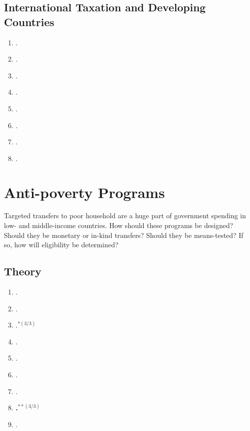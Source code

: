 \documentclass[11pt]{article}
\begin{document}
\subsection{International Taxation and Developing Countries}

\begin{enumerate}
\item {}.
\item {}.
\item {}.
\item {}.
\item {}.
\item {}.
\item {}.
\item {}.
\end{enumerate}

\section{ Anti-poverty Programs}
Targeted transfers to poor household are a huge part of government spending in low- and middle-income countries. How should these programs be designed? Should they be monetary or in-kind transfers? Should they be means-tested? If so, how will eligibility be determined?


\subsection{Theory}

\begin{enumerate}
\item {}.
\item {}.
\item {}.$^{*(3/3)}$
\item {}.
\item {}.
\item {}.
\item {}.
\item \textbf{.$^{**(3/3)}$}
\item {}.
\end{enumerate}
\end{document}
